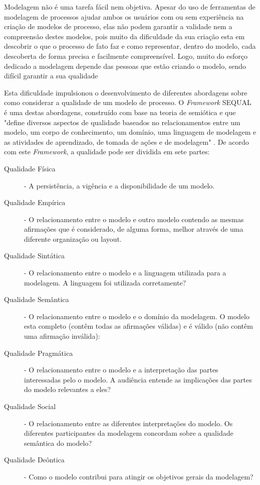 \documentclass[12pt]{article}
\begin{document}
Modelagem não é uma tarefa fácil nem objetiva. Apesar do uso de ferramentas de modelagem de processos ajudar ambos os usuários com ou sem experiência na criação de modelos de processo, elas não podem garantir a validade nem a compreensão destes modelos, pois muito da dificuldade da sua criação esta em descobrir o que o processo de fato faz e como representar, dentro do modelo, cada descoberta de forma precisa e facilmente compreensível. Logo, muito do esforço dedicado a modelagem depende das pessoas que estão criando o modelo, sendo difícil garantir a sua qualidade \cite{Mendling2008}

Esta dificuldade impulsionou o desenvolvimento de diferentes abordagens sobre como considerar a qualidade de um modelo de processo. O \textit{Framework} SEQUAL \cite{Krogstie2006,Lindland1994} é uma destas abordagens, construído com base na teoria de semiótica e que "define diversos aspectos de qualidade baseados no relacionamentos entre um modelo, um corpo de conhecimento, um domínio, uma linguagem de modelagem e as atividades de aprendizado, de tomada de ações e de modelagem" \cite{Mendling2007}. De acordo com este \textit{Framework}, a qualidade pode ser dividida em sete partes:

\begin{description}
	\item [Qualidade Física] - A persistência, a vigência e a disponibilidade de um modelo.
	\item [Qualidade Empírica] - O relacionamento entre o modelo e outro modelo contendo as mesmas afirmações que é considerado, de alguma forma, melhor através de uma diferente organização ou layout.
	\item [Qualidade Sintática] - O relacionamento entre o modelo e a linguagem utilizada para a modelagem. A linguagem foi utilizada corretamente?
	\item [Qualidade Semântica] - O relacionamento entre o modelo e o domínio da modelagem. O modelo esta completo (contêm todas as afirmações válidas) e é válido (não contêm uma afirmação inválida):
	\item [Qualidade Pragmática] - O relacionamento entre o modelo e a interpretação das partes interessadas pelo o modelo. A audiência entende as implicações das partes do modelo relevantes a eles?
	\item [Qualidade Social] - O relacionamento entre as diferentes interpretações do modelo. Os diferentes participantes da modelagem concordam sobre a qualidade semântica do modelo?
	\item [Qualidade Deôntica] - Como o modelo contribui para atingir os objetivos gerais da modelagem?
\end{description}
\end{document}
